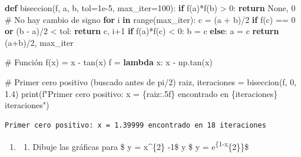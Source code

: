 \documentclass[
  english,
  letterpaper,
  DIV=11,
  numbers=noendperiod]{scrartcl}
\newenvironment{Shaded}{\begin{snugshade}}{\end{snugshade}}
\newcommand{\BuiltInTok}[1]{\textcolor[rgb]{0.00,0.23,0.31}{#1}}
\newcommand{\CommentTok}[1]{\textcolor[rgb]{0.37,0.37,0.37}{#1}}
\newcommand{\ControlFlowTok}[1]{\textcolor[rgb]{0.00,0.23,0.31}{\textbf{#1}}}
\newcommand{\DecValTok}[1]{\textcolor[rgb]{0.68,0.00,0.00}{#1}}
\newcommand{\FloatTok}[1]{\textcolor[rgb]{0.68,0.00,0.00}{#1}}
\newcommand{\KeywordTok}[1]{\textcolor[rgb]{0.00,0.23,0.31}{\textbf{#1}}}
\newcommand{\NormalTok}[1]{\textcolor[rgb]{0.00,0.23,0.31}{#1}}
\newcommand{\OperatorTok}[1]{\textcolor[rgb]{0.37,0.37,0.37}{#1}}
\newcommand{\SpecialCharTok}[1]{\textcolor[rgb]{0.37,0.37,0.37}{#1}}
\newcommand{\SpecialStringTok}[1]{\textcolor[rgb]{0.13,0.47,0.30}{#1}}
\newcommand{\VariableTok}[1]{\textcolor[rgb]{0.07,0.07,0.07}{#1}}
\providecommand{\tightlist}{%
  \setlength{\itemsep}{0pt}\setlength{\parskip}{0pt}}
\begin{document}
\begin{Shaded}
\begin{Highlighting}[]
\KeywordTok{def}\NormalTok{ biseccion(f, a, b, tol}\OperatorTok{=}\FloatTok{1e{-}5}\NormalTok{, max\_iter}\OperatorTok{=}\DecValTok{100}\NormalTok{):}
    \ControlFlowTok{if}\NormalTok{ f(a)}\OperatorTok{*}\NormalTok{f(b) }\OperatorTok{\textgreater{}} \DecValTok{0}\NormalTok{:}
        \ControlFlowTok{return} \VariableTok{None}\NormalTok{, }\DecValTok{0}  \CommentTok{\# No hay cambio de signo}
    \ControlFlowTok{for}\NormalTok{ i }\KeywordTok{in} \BuiltInTok{range}\NormalTok{(max\_iter):}
\NormalTok{        c }\OperatorTok{=}\NormalTok{ (a }\OperatorTok{+}\NormalTok{ b)}\OperatorTok{/}\DecValTok{2}
        \ControlFlowTok{if}\NormalTok{ f(c) }\OperatorTok{==} \DecValTok{0} \KeywordTok{or}\NormalTok{ (b }\OperatorTok{{-}}\NormalTok{ a)}\OperatorTok{/}\DecValTok{2} \OperatorTok{\textless{}}\NormalTok{ tol:}
            \ControlFlowTok{return}\NormalTok{ c, i}\OperatorTok{+}\DecValTok{1}
        \ControlFlowTok{if}\NormalTok{ f(a)}\OperatorTok{*}\NormalTok{f(c) }\OperatorTok{\textless{}} \DecValTok{0}\NormalTok{:}
\NormalTok{            b }\OperatorTok{=}\NormalTok{ c}
        \ControlFlowTok{else}\NormalTok{:}
\NormalTok{            a }\OperatorTok{=}\NormalTok{ c}
    \ControlFlowTok{return}\NormalTok{ (a}\OperatorTok{+}\NormalTok{b)}\OperatorTok{/}\DecValTok{2}\NormalTok{, max\_iter}

\CommentTok{\# Función f(x) = x {-} tan(x)}
\NormalTok{f }\OperatorTok{=} \KeywordTok{lambda}\NormalTok{ x: x }\OperatorTok{{-}}\NormalTok{ np.tan(x)}

\CommentTok{\# Primer cero positivo (buscado antes de pi/2)}
\NormalTok{raiz, iteraciones }\OperatorTok{=}\NormalTok{ biseccion(f, }\DecValTok{0}\NormalTok{, }\FloatTok{1.4}\NormalTok{)}
\BuiltInTok{print}\NormalTok{(}\SpecialStringTok{f"Primer cero positivo: x = }\SpecialCharTok{\{}\NormalTok{raiz}\SpecialCharTok{:.5f\}}\SpecialStringTok{ encontrado en }\SpecialCharTok{\{}\NormalTok{iteraciones}\SpecialCharTok{\}}\SpecialStringTok{ iteraciones"}\NormalTok{)}
\end{Highlighting}
\end{Shaded}

\begin{verbatim}
Primer cero positivo: x = 1.39999 encontrado en 18 iteraciones
\end{verbatim}

\begin{enumerate}
\def\labelenumi{\arabic{enumi}.}
\setcounter{enumi}{3}
\tightlist
\item
  \begin{enumerate}
  \def\labelenumii{\alph{enumii}.}
  \tightlist
  \item
    Dibuje las gráficas para \$ y = x\^{}\{2\} -1\$ y \$ y =
    e\textsuperscript{\{1-x}\{2\}\}\$
  \end{enumerate}
\end{enumerate}
\end{document}

